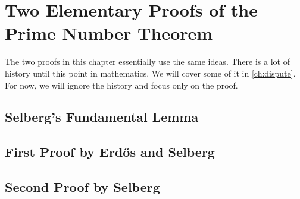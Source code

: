 \documentclass[elemannt.tex]{subfile}
\begin{document}
	\chapter{Two Elementary Proofs of the Prime Number Theorem}\label{ch:pnt}
	The two proofs in this chapter essentially use the same ideas. There is a lot of history until this point in mathematics. We will cover some of it in \autoref{ch:dispute}. For now, we will ignore the history and focus only on the proof.
	\section{Selberg's Fundamental Lemma}
	\section{First Proof by Erd\H{o}s and Selberg}
	\section{Second Proof by Selberg}
\end{document}
